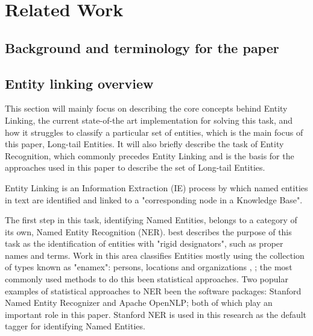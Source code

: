 \section{Related Work} %
\subsection{Background and terminology for the paper}
\subsection{Entity linking overview} %

This section will mainly focus on describing the core concepts behind Entity Linking, the current state-of-the art implementation for solving this task, and how it struggles to classify a particular set of entities, which is the main focus of this paper, Long-tail Entities.
It will also briefly describe the task of Entity Recognition, which commonly precedes Entity Linking and is the basis for the approaches used in this paper to describe the set of Long-tail Entities.

Entity Linking is an Information Extraction (IE) process by which named entities in text are identified and linked to a "corresponding node in a Knowledge Base"\cite{rw_elo_HACHEY2013130}. 

The first step in this task, identifying Named Entities, belongs to a category of its own, Named Entity Recognition (NER).
\cite{rw_elo_Nadeau2009} best describes the purpose of this task as the identification of entities with "rigid designators",
such as proper names and terms. Work in this area classifies Entities mostly using the collection of types known as "enamex": persons, locations and organizations \cite{rw_elo_Nadeau2009},
; the most commonly used methods to do this been statistical approaches.
Two popular examples of statistical approaches to NER been the software packages: Stanford Named Entity Recognizer\cite{rw_elo_finkel2005} and Apache OpenNLP\cite{rw_elo_kottmann2011};
both of which play an important role in this paper. Stanford NER is used in this research as the default tagger for identifying Named Entities.

